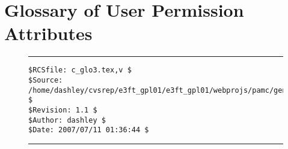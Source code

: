
\chapter{Glossary of User Permission Attributes}

\label{cglo3}




\noindent\begin{figure}[!b]
\noindent\rule[-0.25in]{\textwidth}{1pt}
\begin{tiny}
\begin{verbatim}
$RCSfile: c_glo3.tex,v $
$Source: /home/dashley/cvsrep/e3ft_gpl01/e3ft_gpl01/webprojs/pamc/gen_a/docs/manual/man_a/c_glo3/c_glo3.tex,v $
$Revision: 1.1 $
$Author: dashley $
$Date: 2007/07/11 01:36:44 $
\end{verbatim}
\end{tiny}
\noindent\rule[0.25in]{\textwidth}{1pt}
\end{figure}

%
